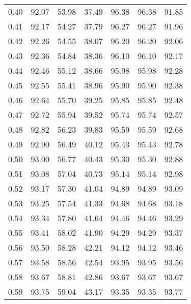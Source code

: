 \begin{tabular}{|c|c|c|c|c|c|c|}
      0.40 &     92.07 &     53.98 &      37.49 &   96.38 &      96.38 &         91.85 \\
      0.41 &     92.17 &     54.27 &      37.79 &   96.27 &      96.27 &         91.96 \\
      0.42 &     92.26 &     54.55 &      38.07 &   96.20 &      96.20 &         92.06 \\
      0.43 &     92.36 &     54.84 &      38.36 &   96.10 &      96.10 &         92.17 \\
      0.44 &     92.46 &     55.12 &      38.66 &   95.98 &      95.98 &         92.28 \\
      0.45 &     92.55 &     55.41 &      38.96 &   95.90 &      95.90 &         92.38 \\
      0.46 &     92.64 &     55.70 &      39.25 &   95.85 &      95.85 &         92.48 \\
      0.47 &     92.72 &     55.94 &      39.52 &   95.74 &      95.74 &         92.57 \\
      0.48 &     92.82 &     56.23 &      39.83 &   95.59 &      95.59 &         92.68 \\
      0.49 &     92.90 &     56.49 &      40.12 &   95.43 &      95.43 &         92.78 \\
      0.50 &     93.00 &     56.77 &      40.43 &   95.30 &      95.30 &         92.88 \\
      0.51 &     93.08 &     57.04 &      40.73 &   95.14 &      95.14 &         92.98 \\
      0.52 &     93.17 &     57.30 &      41.04 &   94.89 &      94.89 &         93.09 \\
      0.53 &     93.25 &     57.54 &      41.33 &   94.68 &      94.68 &         93.18 \\
      0.54 &     93.34 &     57.80 &      41.64 &   94.46 &      94.46 &         93.29 \\
      0.55 &     93.41 &     58.02 &      41.90 &   94.29 &      94.29 &         93.37 \\
      0.56 &     93.50 &     58.28 &      42.21 &   94.12 &      94.12 &         93.46 \\
      0.57 &     93.58 &     58.56 &      42.54 &   93.95 &      93.95 &         93.56 \\
      0.58 &     93.67 &     58.81 &      42.86 &   93.67 &      93.67 &         93.67 \\
      0.59 &     93.75 &     59.04 &      43.17 &   93.35 &      93.35 &         93.77 \\

\end{tabular}
